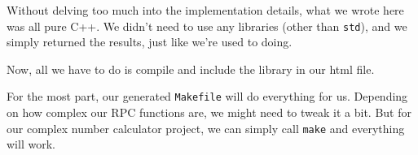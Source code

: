 \begin{Shaded}
\begin{Highlighting}[]
  \NormalTok{\}}
   
\NormalTok{\}}

\NormalTok{\}}
\NormalTok{\}}
\end{Highlighting}
\end{Shaded}

Without delving too much into the implementation details, what we wrote
here was all pure C++. We didn't need to use any libraries (other than
\texttt{std}), and we simply returned the results, just like we're used
to doing.

Now, all we have to do is compile and include the library in our html
file.


For the most part, our generated \texttt{Makefile} will do everything
for us. Depending on how complex our RPC functions are, we might need to
tweak it a bit. But for our complex number calculator project, we can
simply call \texttt{make} and everything will work.

\begin{Shaded}
\begin{Highlighting}[]
\end{Highlighting}
\end{Shaded}

\begin{Shaded}
\begin{Highlighting}[]
    
    
   
   
   
\end{Highlighting}
\end{Shaded}

